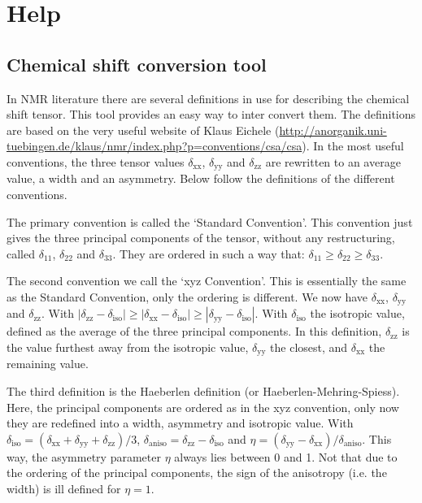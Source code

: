 \documentclass[11pt,a4paper]{article}
\begin{document}
\section{Help}
\subsection{Chemical shift conversion tool}
In NMR literature there are several definitions in use for describing the chemical shift tensor. This tool provides an easy way to inter convert them. The definitions are based on the very useful website of Klaus Eichele (\url{http://anorganik.uni-tuebingen.de/klaus/nmr/index.php?p=conventions/csa/csa}). In the most useful conventions, the three tensor values $\delta_\text{xx}$, $\delta_\text{yy}$ and $\delta_\text{zz}$ are rewritten to an average value, a width and an asymmetry. Below follow the definitions of the different conventions.

The primary convention is called the `Standard Convention'. This convention just gives the three principal components of the tensor, without any restructuring, called $\delta_\text{11}$, $\delta_\text{22}$ and $\delta_\text{33}$. They are ordered in such a way that: $\delta_\text{11} \geq \delta_\text{22} \geq \delta_\text{33}$.

The second convention we call the `xyz Convention'. This is essentially the same as the Standard Convention, only the ordering is different. We now have $\delta_\text{xx}$, $\delta_\text{yy}$ and $\delta_\text{zz}$. With $|\delta_\text{zz}-\delta_\text{iso}| \geq |\delta_\text{xx}-\delta_\text{iso}| \geq |\delta_\text{yy}-\delta_\text{iso}|$. With $\delta_\text{iso}$ the isotropic value, defined as the average of the three principal components. In this definition, $\delta_\text{zz}$ is the value furthest away from the isotropic value, $\delta_\text{yy}$ the closest, and $\delta_\text{xx}$ the remaining value.

The third definition is the Haeberlen definition (or Haeberlen-Mehring-Spiess). Here, the principal components are ordered as in the xyz convention, only now they are redefined into a width, asymmetry and isotropic value. With $\delta_\text{iso} = (\delta_\text{xx} +\delta_\text{yy} +\delta_\text{zz})/3$, $\delta_\text{aniso} = \delta_\text{zz} -\delta_\text{iso}$ and $\eta = (\delta_\text{yy}-\delta_\text{xx})/\delta_\text{aniso}$. This way, the asymmetry parameter $\eta$ always lies between 0 and 1. Not that due to the ordering of the principal components, the sign of the anisotropy (i.e. the width) is ill defined for $\eta=1$.
\end{document}
